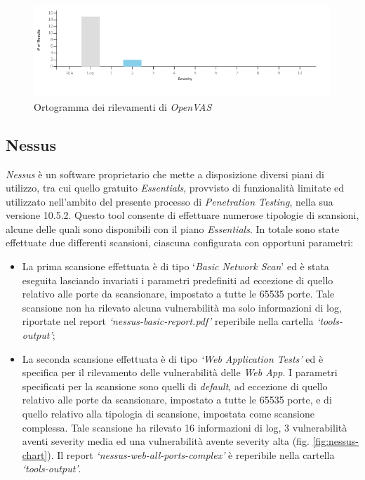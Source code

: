 \begin{figure}[h]
    \centering
    \includegraphics[scale=0.3]{capitoli/images/openvas-chart2.png}
    \caption{Ortogramma dei rilevamenti di \emph{OpenVAS}}
    \label{fig:openvas_chart2}
\end{figure}
\subsection{Nessus}
\emph{Nessus} è un software proprietario che mette a disposizione diversi piani di utilizzo, tra cui quello gratuito \emph{Essentials}, provvisto di funzionalità limitate ed utilizzato nell'ambito del presente processo di \emph{Penetration Testing}, nella sua versione 10.5.2. Questo tool consente di effettuare numerose tipologie di scansioni, alcune delle quali sono disponibili con il piano \emph{Essentials}. In totale sono state effettuate due differenti scansioni, ciascuna configurata con opportuni parametri:
\begin{itemize}
    \item La prima scansione effettuata è di tipo `\emph{Basic Network Scan}' ed è stata eseguita lasciando invariati i parametri predefiniti ad eccezione di quello relativo alle porte da scansionare, impostato a tutte le 65535 porte. Tale scansione non ha rilevato alcuna vulnerabilità ma solo informazioni di log, riportate nel report \emph{`nessus-basic-report.pdf'} reperibile nella cartella \emph{`tools-output'};
    \item La seconda scansione effettuata è di tipo \emph{`Web Application Tests'} ed è specifica per il rilevamento delle vulnerabilità delle \emph{Web App}. I parametri specificati per la scansione sono quelli di \emph{default}, ad eccezione di quello relativo alle porte da scansionare, impostato a tutte le 65535 porte, e di quello relativo alla tipologia di scansione, impostata come scansione complessa. Tale scansione ha rilevato 16 informazioni di log, 3 vulnerabilità aventi severity media ed una vulnerabilità avente severity alta (fig. \ref{fig:nessus-chart}). Il report \emph{`nessus-web-all-ports-complex'} è reperibile nella cartella \emph{`tools-output'}.
\end{itemize}
